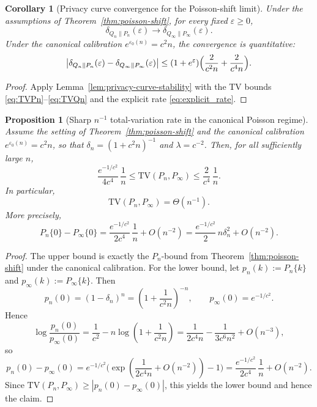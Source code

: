 \documentclass{article}
\newtheorem{proposition}[theorem]{Proposition}
\newtheorem{corollary}[theorem]{Corollary}
\begin{document}
\begin{corollary}[Privacy curve convergence for the Poisson-shift limit]
\label{cor:poisson-privacy-curve-convergence}
Under the assumptions of Theorem~\ref{thm:poisson-shift}, for every fixed $\varepsilon \geq 0$,
\[
\delta_{Q_n\|P_n}(\varepsilon) \to \delta_{Q_\infty\|P_\infty}(\varepsilon).
\]
Under the canonical calibration $e^{\varepsilon_0(n)} = c^2 n$, the convergence is quantitative:
\[
\bigl|\delta_{Q_n\|P_n}(\varepsilon) - \delta_{Q_\infty\|P_\infty}(\varepsilon)\bigr|
\leq (1 + e^\varepsilon)\Bigl(\frac{2}{c^2 n} + \frac{2}{c^4 n}\Bigr).
\]
\end{corollary}

\begin{proof}
Apply Lemma~\ref{lem:privacy-curve-stability} with the TV bounds \eqref{eq:TVPn}--\eqref{eq:TVQn}
and the explicit rate \eqref{eq:explicit_rate}.
\end{proof}

\begin{proposition}[Sharp $n^{-1}$ total-variation rate in the canonical Poisson regime]
\label{prop:poisson-tv-rate}
Assume the setting of Theorem~\ref{thm:poisson-shift} and the canonical calibration $e^{\varepsilon_0(n)}=c^2 n$, so that
$\delta_n=(1+c^2 n)^{-1}$ and $\lambda=c^{-2}$. Then, for all sufficiently large $n$,
\[
\frac{e^{-1/c^2}}{4c^4}\,\frac1n
\le \mathrm{TV}(P_n,P_\infty)
\le \frac{2}{c^4}\,\frac1n.
\]
In particular,
\[
\mathrm{TV}(P_n,P_\infty)=\Theta(n^{-1}).
\]
More precisely,
\[
P_n\{0\}-P_\infty\{0\}
= \frac{e^{-1/c^2}}{2c^4}\,\frac1n + O(n^{-2})
= \frac{e^{-1/c^2}}{2}\,n\delta_n^2 + O(n^{-2}).
\]
\end{proposition}

\begin{proof}
The upper bound is exactly the $P_n$-bound from Theorem~\ref{thm:poisson-shift} under the canonical calibration.
For the lower bound, let $p_n(k):=P_n\{k\}$ and $p_\infty(k):=P_\infty\{k\}$. Then
\[
p_n(0)=(1-\delta_n)^n=\left(1+\frac{1}{c^2 n}\right)^{-n},
\qquad
p_\infty(0)=e^{-1/c^2}.
\]
Hence
\[
\log\frac{p_n(0)}{p_\infty(0)}
=\frac1{c^2}-n\log\left(1+\frac1{c^2 n}\right)
=\frac{1}{2c^4 n}-\frac{1}{3c^6 n^2}+O(n^{-3}),
\]
so
\[
p_n(0)-p_\infty(0)
=e^{-1/c^2}\Bigg(\exp\!\left(\frac{1}{2c^4 n}+O(n^{-2})\right)-1\Bigg)
=\frac{e^{-1/c^2}}{2c^4}\,\frac1n+O(n^{-2}).
\]
Since $\mathrm{TV}(P_n,P_\infty)\ge |p_n(0)-p_\infty(0)|$, this yields the lower bound and hence the claim.
\end{proof}
\end{document}
